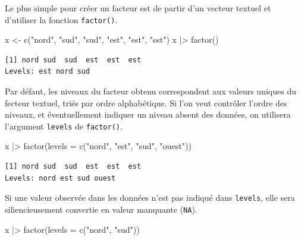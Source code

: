 \documentclass[
  letterpaper,
  DIV=11,
  numbers=noendperiod,
  oneside]{scrreprt}
\newenvironment{Shaded}{\begin{snugshade}}{\end{snugshade}}
\newcommand{\AttributeTok}[1]{\textcolor[rgb]{0.40,0.45,0.13}{#1}}
\newcommand{\FunctionTok}[1]{\textcolor[rgb]{0.28,0.35,0.67}{#1}}
\newcommand{\NormalTok}[1]{\textcolor[rgb]{0.00,0.23,0.31}{#1}}
\newcommand{\OtherTok}[1]{\textcolor[rgb]{0.00,0.23,0.31}{#1}}
\newcommand{\SpecialCharTok}[1]{\textcolor[rgb]{0.37,0.37,0.37}{#1}}
\newcommand{\StringTok}[1]{\textcolor[rgb]{0.13,0.47,0.30}{#1}}
\begin{document}
Le plus simple pour créer un facteur est de partir d'un vecteur textuel
et d'utiliser la fonction \texttt{factor()}.

\begin{Shaded}
\begin{Highlighting}[]
\NormalTok{x }\OtherTok{\textless{}{-}} \FunctionTok{c}\NormalTok{(}\StringTok{"nord"}\NormalTok{, }\StringTok{"sud"}\NormalTok{, }\StringTok{"sud"}\NormalTok{, }\StringTok{"est"}\NormalTok{, }\StringTok{"est"}\NormalTok{, }\StringTok{"est"}\NormalTok{)}
\NormalTok{x }\SpecialCharTok{|\textgreater{}} 
  \FunctionTok{factor}\NormalTok{()}
\end{Highlighting}
\end{Shaded}

\begin{verbatim}
[1] nord sud  sud  est  est  est 
Levels: est nord sud
\end{verbatim}

Par défaut, les niveaux du facteur obtenu correspondent aux valeurs
uniques du fecteur textuel, triés par ordre alphabétique. Si l'on veut
contrôler l'ordre des niveaux, et éventuellement indiquer un niveau
absent des données, on utilisera l'argument \texttt{levels} de
\texttt{factor()}.

\begin{Shaded}
\begin{Highlighting}[]
\NormalTok{x }\SpecialCharTok{|\textgreater{}} 
  \FunctionTok{factor}\NormalTok{(}\AttributeTok{levels =} \FunctionTok{c}\NormalTok{(}\StringTok{"nord"}\NormalTok{, }\StringTok{"est"}\NormalTok{, }\StringTok{"sud"}\NormalTok{, }\StringTok{"ouest"}\NormalTok{))}
\end{Highlighting}
\end{Shaded}

\begin{verbatim}
[1] nord sud  sud  est  est  est 
Levels: nord est sud ouest
\end{verbatim}

Si une valeur observée dans les données n'est pas indiqué dans
\texttt{levels}, elle sera siliencieusement convertie en valeur
manquante (\texttt{NA}).

\begin{Shaded}
\begin{Highlighting}[]
\NormalTok{x }\SpecialCharTok{|\textgreater{}} 
  \FunctionTok{factor}\NormalTok{(}\AttributeTok{levels =} \FunctionTok{c}\NormalTok{(}\StringTok{"nord"}\NormalTok{, }\StringTok{"sud"}\NormalTok{))}
\end{Highlighting}
\end{Shaded}
\end{document}
